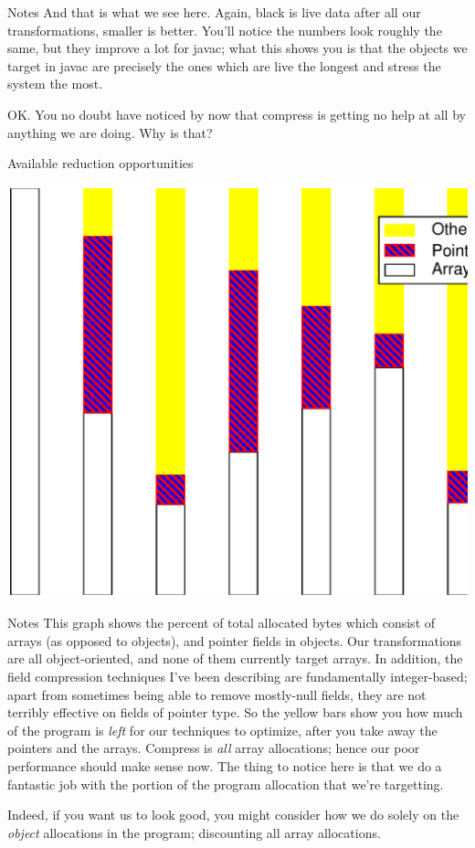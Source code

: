 \documentclass[%
pdf,
colorBG,
slideColor,
nototal,
oqe
]{prosper}
\newenvironment{talknotes}{\begin{slide}{Notes}\tiny}{\end{slide}}
\begin{document}
\begin{talknotes}
And that is what we see here.  Again, black is live data after all our
transformations, smaller is better.
You'll notice the numbers look roughly
the same, but they improve a lot for javac; what this shows you is
that the objects we target in javac are precisely the ones which are
live the longest and stress the system the most.

OK.  You no doubt have noticed by now that compress is getting no help
at all by anything we are doing.  Why is that?
\end{talknotes}

\begin{slide}{Available reduction opportunities}
\begin{center}
\includegraphics[scale=0.45]{Figures/spec-space-3.eps}
\end{center}
\end{slide}

\begin{talknotes}
This graph shows the percent of total allocated bytes which consist of
arrays (as opposed to objects), and pointer fields in objects.
Our transformations are all object-oriented, and none of them
currently target arrays.  In addition, the field compression
techniques I've been describing are fundamentally integer-based;
apart from sometimes being able to remove mostly-null fields,
they are not terribly effective on fields of pointer type.  So the
yellow bars show you how much of the program is \emph{left} for our
techniques to optimize, after you take away the pointers and the arrays.
Compress is \emph{all} array allocations; hence our poor performance
should make sense now.  The thing to notice here is that we do a
fantastic job with the portion of the program allocation that we're
targetting.

Indeed, if you want us to look good, you might consider how we do
solely on the \emph{object} allocations in the program; discounting
all array allocations.
\end{talknotes}
\end{document}
